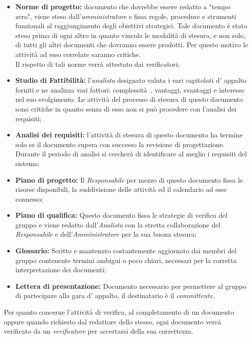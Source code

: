 \begin{itemize}
	\item \textbf{Norme di progetto:} documento che dovrebbe essere redatto a "tempo zero", viene steso dall'\textit{amministratore} e fissa regole, procedure e strumenti funzionali al raggiungimento degli obiettivi strategici. Tale documento è stato steso prima di ogni altro in quanto vincola le modalità di stesura, e non solo, di tutti gli altri documenti che dovranno essere prodotti. Per questo motivo le attività ad esso correlate saranno critiche.
	\\ Il rispetto di tali norme verrà attestato dai verificatori;
	\item \textbf{Studio di Fattibilità:} l'\textit{analista} designato valuta i vari capitolati d' appalto forniti e ne analizza vari fattori: complessità~, vantaggi, svantaggi e interesse nel suo svolgimento. Le attività del processo di stesura di questo documento sono critiche in quanto senza di esso non si può procedere con l'analisi dei requisiti;
	\item \textbf{Analisi dei requisiti:} l'attività di stesura di questo documento ha termine solo se il documento supera con successo la revisione di progettazione. Durante il periodo di analisi si cercherà di identificare al meglio i requisiti del sistema;
	\item \textbf{Piano di progetto:} Il \textit{Responsabile} per mezzo di questo documento fissa le risorse disponibili, la suddivisione delle attività ed il calendario ad esse connesso; 
	\item \textbf{Piano di qualifica:} Questo documento fissa le strategie di verifica del gruppo e viene redatto dall'\textit{Analista} con la stretta collaborazione del \textit{Responsabile} e dell'\textit{Amministratore} per la sua buona stesura;
	\item \textbf{Glossario:} Scritto e mantenuto costantemente aggiornato dai membri del gruppo contenente termini ambigui o poco chiari, necessari per la corretta interpretazione dei documenti;
	\item \textbf{Lettera di presentazione:} Documento necessario per permettere al gruppo di partecipare alla gara d' appalto, il destinatario è il \textit{committente}.
\end{itemize}
Per quanto concerne l'attività di verifica, al completamento di un documento oppure quando richiesto dal redattore dello stesso, ogni documento verrà verificato da un \textit{verificatore} per accertarsi della sua correttezza.\\

